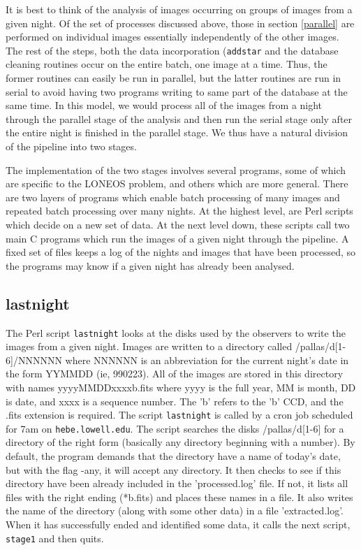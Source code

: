\documentclass{article}
\begin{document}
It is best to think of the analysis of images occurring on groups of
images from a given night.  Of the set of processes discussed above,
those in section \ref{parallel} are performed on individual images
essentially independently of the other images.  The rest of the steps,
both the data incorporation ({\tt addstar} and the database cleaning
routines occur on the entire batch, one image at a time.  Thus, the
former routines can easily be run in parallel, but the latter routines
are run in serial to avoid having two programs writing to same part of
the database at the same time.  In this model, we would process all of
the images from a night through the parallel stage of the analysis and
then run the serial stage only after the entire night is finished in
the parallel stage.  We thus have a natural division of the pipeline
into two stages.  

The implementation of the two stages involves several programs, some
of which are specific to the LONEOS problem, and others which are more
general.  There are two layers of programs which enable batch
processing of many images and repeated batch processing over many
nights.  At the highest level, are Perl scripts which decide on a new
set of data.  At the next level down, these scripts call two main C
programs which run the images of a given night through the pipeline.  
A fixed set of files keeps a log of the nights and images that have
been processed, so the programs may know if a given night has already
been analysed. 

\subsection{lastnight}

The Perl script {\tt lastnight} looks at the disks used by the
observers to write the images from a given night.  Images are written
to a directory called /pallas/d[1-6]/NNNNNN where NNNNNN is an
abbreviation for the current night's date in the form YYMMDD (ie,
990223).  All of the images are stored in this directory with names
yyyyMMDDxxxxb.fits where yyyy is the full year, MM is month, DD is
date, and xxxx is a sequence number.  The 'b' refers to the 'b' CCD,
and the .fits extension is required.  The script {\tt lastnight} is
called by a cron job scheduled for 7am on {\tt hebe.lowell.edu}.  The
script searches the disks /pallas/d[1-6] for a directory of the right
form (basically any directory beginning with a number).  By default,
the program demands that the directory have a name of today's date,
but with the flag -any, it will accept any directory.  It then checks
to see if this directory have been already included in the
'processed.log' file.  If not, it lists all files with the right
ending (*b.fits) and places these names in a file.  It also writes the
name of the directory (along with some other data) in a file
'extracted.log'.  When it has successfully ended and identified some
data, it calls the next script, {\tt stage1} and then quits.  
\end{document}
